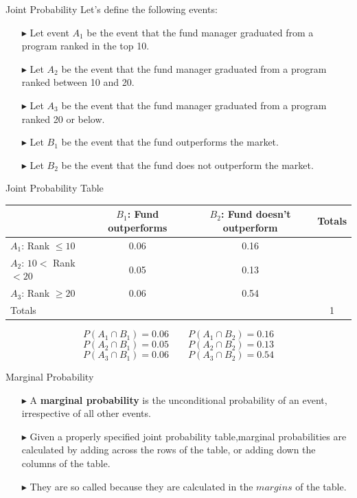 \documentclass[12pt]{beamer}
\begin{document}
\begin{frame}{Joint Probability}
	Let's define the following events:
	\begin{itemize}
		\item[$\blacktriangleright$] Let event $A_1$ be the event that the fund manager graduated from a program ranked in the top 10.
		\item[$\blacktriangleright$] Let $A_2$ be the event that the fund manager graduated from a program ranked between 10 and 20.
		\item[$\blacktriangleright$] Let $A_3$ be the event that the fund manager graduated from a program ranked 20 or below.
		\item[$\blacktriangleright$] Let $B_1$ be the event that the fund outperforms the market.
		\item[$\blacktriangleright$] Let $B_2$ be the event that the fund does not outperform the market.
	\end{itemize}
\end{frame}
\begin{frame}{Joint Probability Table}
	\begin{center}
		\begin{tabular}{lccc}
			\toprule
			&\parbox[t]{3cm}{$B_1$: Fund \\outperforms} &\parbox[t]{3cm}{$B_2$: Fund doesn't\\ outperform}&Totals\\
			\hline
			$A_1$: Rank $\le10$&0.06&0.16&\\
			$A_2$: $10<$ Rank $<20$&0.05&0.13&\\
			$A_3$: Rank $\ge20$&0.06&0.54&\\
			\hline
			Totals&&&1\\
			\bottomrule
		\end{tabular}
	\end{center}
	$$P(A_1\cap B_1)=0.06\quad\quad P(A_1\cap B_2)=0.16$$
	$$P(A_2\cap B_1)=0.05\quad\quad P(A_2\cap B_2)=0.13$$
	$$P(A_3\cap B_1)=0.06\quad\quad P(A_3\cap B_2)=0.54$$
\end{frame}
\begin{frame}{Marginal Probability}
\begin{itemize}
\item[$\blacktriangleright$] A {\bf marginal probability} is the unconditional probability of an event, irrespective of all other events.
\item[$\blacktriangleright$] Given a properly specified joint probability table,marginal probabilities are calculated by adding across the rows of the table, or adding down the columns of the table.
\item[$\blacktriangleright$] They are so called because they are calculated in the $margins$ of the table.
\end{itemize}
\end{frame}
\end{document}
